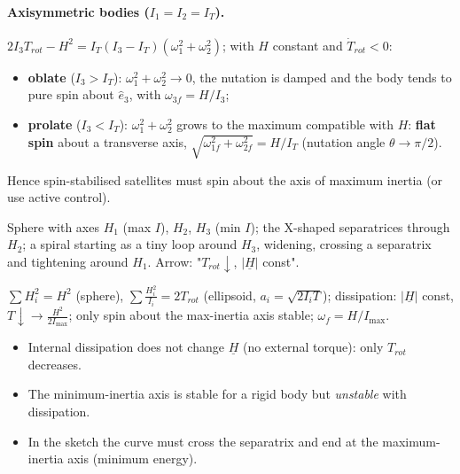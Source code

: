 \paragraph{Axisymmetric bodies ($I_1=I_2=I_T$).} $2I_3T_{rot}-H^2=I_T(I_3-I_T)(\omega_1^2+\omega_2^2)$; with $H$ constant and $\dot T_{rot}<0$:
\begin{itemize}
\item \textbf{oblate} ($I_3>I_T$): $\omega_1^2+\omega_2^2\to0$, the nutation is damped and the body tends to pure spin about $\hat e_3$,
with $\omega_{3f}=H/I_3$;
\item \textbf{prolate} ($I_3<I_T$): $\omega_1^2+\omega_2^2$ grows to the maximum compatible with $H$: \textbf{flat spin} about a transverse axis,
$\sqrt{\omega_{1f}^2+\omega_{2f}^2}=H/I_T$ (nutation angle $\theta\to\pi/2$).
\end{itemize}
Hence spin-stabilised satellites must spin about the axis of maximum inertia (or use active control).

\begin{fig2draw}
Sphere with axes $H_1$ (max $I$), $H_2$, $H_3$ (min $I$); the X-shaped separatrices through $H_2$; a spiral starting as a tiny loop around
$H_3$, widening, crossing a separatrix and tightening around $H_1$. Arrow: "$T_{rot}\downarrow$, $|\underline H|$ const".
\end{fig2draw}

\begin{keyf}
$\sum H_i^2=H^2$ (sphere), $\sum\frac{H_i^2}{I_i}=2T_{rot}$ (ellipsoid, $a_i=\sqrt{2I_iT}$); dissipation: $|\underline H|$ const, $T\downarrow\to\frac{H^2}{2I_{\max}}$;
only spin about the max-inertia axis stable; $\omega_f=H/I_{\max}$.
\end{keyf}

\pitfalls
\begin{itemize}
\item Internal dissipation does not change $\underline H$ (no external torque): only $T_{rot}$ decreases.
\item The minimum-inertia axis is stable for a rigid body but \emph{unstable} with dissipation.
\item In the sketch the curve must cross the separatrix and end at the maximum-inertia axis (minimum energy).
\end{itemize}

